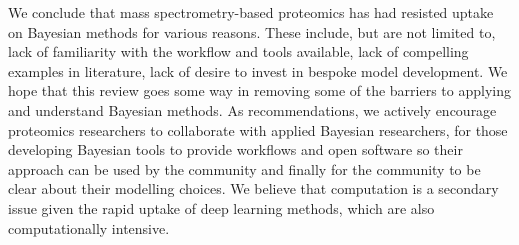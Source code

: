 \documentclass[12pt,english, journal=jpr, layout=twocolumn]{article}
\begin{document}
We conclude that mass spectrometry-based proteomics has had resisted uptake on Bayesian methods for various reasons. These include, but are not limited to, lack of familiarity with the workflow and tools available, lack of compelling examples in literature, lack of desire to invest in bespoke model development. We hope that this review goes some way in removing some of the barriers to applying and understand Bayesian methods. As recommendations, we actively encourage proteomics researchers to collaborate with applied Bayesian researchers, for those developing Bayesian tools to provide workflows and open software so their approach can be used by the community and finally for the community to be clear about their modelling choices. We believe that computation is a secondary issue given the rapid uptake of deep learning methods, which are also computationally intensive.

	

	
\end{document}
